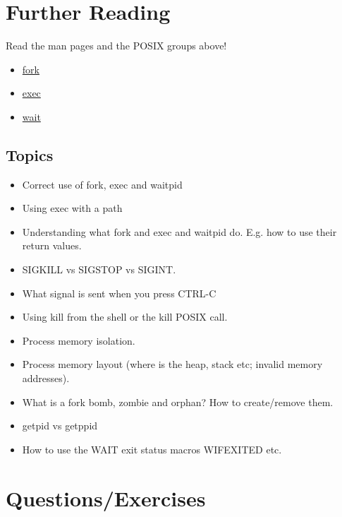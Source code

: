 \begin{itemize}
\section{Further Reading}

Read the man pages and the POSIX groups above!

\begin{itemize}
    \item \href{http://man7.org/linux/man-pages/man2/fork.2.html}{fork}
    \item \href{http://man7.org/linux/man-pages/man3/exec.3.html}{exec}
    \item \href{http://man7.org/linux/man-pages/man2/wait.2.html}{wait}
\end{itemize}

\subsection{Topics}

\begin{itemize}
    \item
          Correct use of fork, exec and waitpid
    \item
          Using exec with a path
    \item
          Understanding what fork and exec and waitpid do. E.g. how to use their return values.
    \item
          SIGKILL vs SIGSTOP vs SIGINT.
    \item
          What signal is sent when you press CTRL-C
    \item
          Using kill from the shell or the kill POSIX call.
    \item
          Process memory isolation.
    \item
          Process memory layout (where is the heap, stack etc; invalid memory addresses).
    \item
          What is a fork bomb, zombie and orphan? How to create/remove them.
    \item
          getpid vs getppid
    \item
          How to use the WAIT exit status macros WIFEXITED etc.
\end{itemize}

\section{Questions/Exercises}


\end{itemize}
